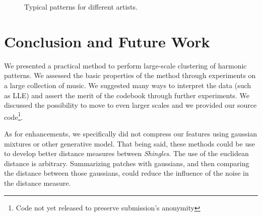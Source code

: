 \documentclass{article}
\begin{document}
\begin{figure}[htb]
  \centering
  \hspace{5mm}                
  \caption{\small{Typical patterns for different artists.}}
  \label{fig:typicalpat}
\end{figure}



\section{Conclusion and Future Work}
We presented a practical method to perform large-scale clustering of
harmonic patterns. We assessed the basic properties of the method through
experiments on a large collection of music. We suggested many ways
to interpret the data (such as LLE) and assert the merit of the codebook
through further experiments.
We discussed the possibility to move to even larger scales
and we provided our source code\footnote{Code not yet released to preserve
submission's anonymity}.

As for enhancements, we specifically did not compress our features using
gaussian mixtures or other generative model. That being said, these methods
could be use to develop better distance measures between \textit{Shingles}.
The use of the euclidean distance is arbitrary. Summarizing patches
with gaussians, and then comparing the distance between those gaussians,
could reduce the influence of the noise in the distance measure.
\end{document}

